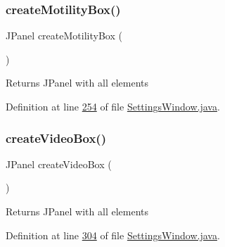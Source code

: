 \hypertarget{classgui_1_1_settings_window_ac852b9b8b2e0cd2bf5bc764d41e2b0ec}{}\label{classgui_1_1_settings_window_ac852b9b8b2e0cd2bf5bc764d41e2b0ec} 
\subsubsection{\texorpdfstring{create\+Motility\+Box()}{createMotilityBox()}}
{\footnotesize\ttfamily J\+Panel create\+Motility\+Box (\begin{DoxyParamCaption}{ }\end{DoxyParamCaption})}

\begin{DoxyReturn}{Returns}
J\+Panel with all elements 
\end{DoxyReturn}


Definition at line \hyperlink{_settings_window_8java_source_l00254}{254} of file \hyperlink{_settings_window_8java_source}{Settings\+Window.\+java}.

\hypertarget{classgui_1_1_settings_window_abfe7515fa4028f1aa2cc483ae44f2fc0}{}\label{classgui_1_1_settings_window_abfe7515fa4028f1aa2cc483ae44f2fc0} 
\subsubsection{\texorpdfstring{create\+Video\+Box()}{createVideoBox()}}
{\footnotesize\ttfamily J\+Panel create\+Video\+Box (\begin{DoxyParamCaption}{ }\end{DoxyParamCaption})}

\begin{DoxyReturn}{Returns}
J\+Panel with all elements 
\end{DoxyReturn}


Definition at line \hyperlink{_settings_window_8java_source_l00304}{304} of file \hyperlink{_settings_window_8java_source}{Settings\+Window.\+java}.

\hypertarget{classgui_1_1_settings_window_a1d6c94586a33965dd4277c7fe62de430}{}\label{classgui_1_1_settings_window_a1d6c94586a33965dd4277c7fe62de430} 
